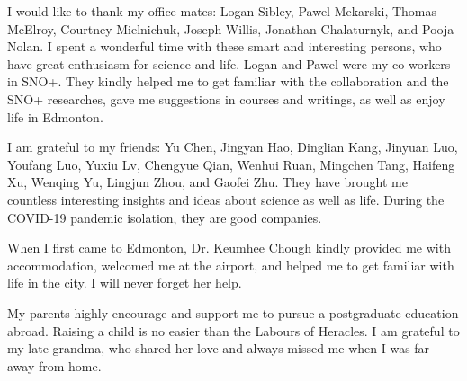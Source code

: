 I would like to thank my office mates: Logan Sibley, Pawel Mekarski, Thomas McElroy, Courtney Mielnichuk, Joseph Willis, Jonathan Chalaturnyk, and Pooja Nolan. I spent a wonderful time with these smart and interesting persons, who have great enthusiasm for science and life. Logan and Pawel were my co-workers in SNO+. They kindly helped me to get familiar with the collaboration and the SNO+ researches, gave me suggestions in courses and writings, as well as enjoy life in Edmonton.

I am grateful to my friends: Yu Chen, Jingyan Hao, Dinglian Kang, Jinyuan Luo, Youfang Luo, Yuxiu Lv, Chengyue Qian, Wenhui Ruan, Mingchen Tang, Haifeng Xu, Wenqing Yu, Lingjun Zhou, and Gaofei Zhu. They have brought me countless interesting insights and ideas about science as well as life. During the COVID-19 pandemic isolation, they are good companies.

When I first came to Edmonton, Dr. Keumhee Chough kindly provided me with accommodation, welcomed me at the airport, and helped me to get familiar with life in the city. I will never forget her help.

My parents highly encourage and support me to pursue a postgraduate education abroad. Raising a child is no easier than the Labours of Heracles. I am grateful to my late grandma, who shared her love and always missed me when I was far away from home.